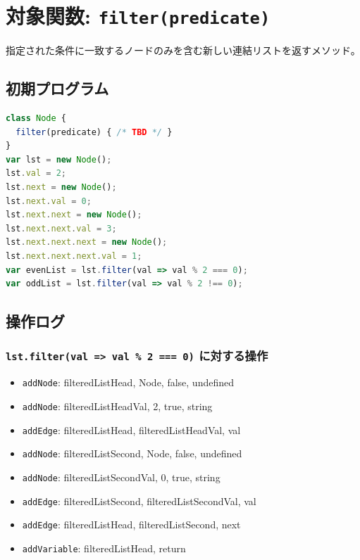 \documentclass{article}
\begin{document}

\section{対象関数: \texttt{filter(predicate)}}
指定された条件に一致するノードのみを含む新しい連結リストを返すメソッド。

\subsection{初期プログラム}

\begin{lstlisting}[language=JavaScript]
class Node {
  filter(predicate) { /* TBD */ }
}
var lst = new Node(); 
lst.val = 2;
lst.next = new Node();
lst.next.val = 0;
lst.next.next = new Node();
lst.next.next.val = 3;
lst.next.next.next = new Node();
lst.next.next.next.val = 1;
var evenList = lst.filter(val => val % 2 === 0);
var oddList = lst.filter(val => val % 2 !== 0);
\end{lstlisting}

\subsection{操作ログ}

\subsubsection{\texttt{lst.filter(val => val \% 2 === 0)} に対する操作}
\begin{itemize}
  \item \texttt{addNode}: filteredListHead, Node, false, undefined
  \item \texttt{addNode}: filteredListHeadVal, 2, true, string
  \item \texttt{addEdge}: filteredListHead, filteredListHeadVal, val
  \item \texttt{addNode}: filteredListSecond, Node, false, undefined
  \item \texttt{addNode}: filteredListSecondVal, 0, true, string
  \item \texttt{addEdge}: filteredListSecond, filteredListSecondVal, val
  \item \texttt{addEdge}: filteredListHead, filteredListSecond, next
  \item \texttt{addVariable}: filteredListHead, return
\end{itemize}
\end{document}
